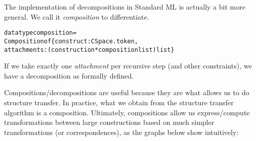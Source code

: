 \documentclass[a4paper]{article}
\theoremstyle{definition}
\begin{document}
		The implementation of decompositions in Standard ML is actually a bit more general. We call it \textit{composition} to differentiate.
		\begin{alltt}
datatype composition = 
             Composition of \{construct : CSpace.token,
                             attachments : (construction * composition list) list\}
		\end{alltt}
		If we take exactly one \textit{attachment} per recursive step (and other constraints), we have a decomposition as formally defined.
		
		Compositions/decompositions are useful because they are what allows us to do structure transfer. In practice, what we obtain from the structure transfer algorithm is a composition. Ultimately, compositions allow us express/compute transformations between large constructions based on much simpler transformations (or correspondences), as the graphs below show intuitively:
	
\end{document}

